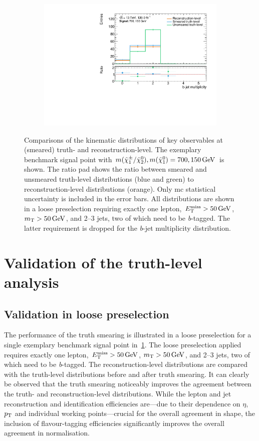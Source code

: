 \begin{figure}
\begin{subfigure}[b]{0.45\linewidth}
		\centering\includegraphics[width=\textwidth]{20210324/700_150/nBJet30_C1N2_Wh_hbb_700p0_150p0_smeared.pdf}
	\end{subfigure}\hfill
	\caption{Comparisons of the kinematic distributions of key observables at (smeared) truth- and reconstruction-level. The exemplary benchmark signal point with $m(\charg/\neutr), m(\lsp) = 700, \SI{150}{\GeV}$ is shown. The ratio pad shows the ratio between smeared and unsmeared truth-level distributions (blue and green) to reconstruction-level distributions (orange). Only \gls{mc} statistical uncertainty is included in the error bars. All distributions are shown in a loose preselection requiring exactly one lepton, $\met>\SI{50}{\GeV}$, $\mt > \SI{50}{\GeV}$, and 2--3 jets, two of which need to be \textit{b}-tagged. The latter requirement is dropped for the \textit{b}-jet multiplicity distribution.}
	\label{fig:smearing_preselection}
\end{figure}
 
\section{Validation of the truth-level analysis}

\subsection{Validation in loose preselection}

 The performance of the truth smearing is illustrated in a loose preselection for a single exemplary benchmark signal point in~\cref{fig:smearing_preselection}. The loose preselection applied requires exactly one lepton, $\met>\SI{50}{\GeV}$, $\mt > \SI{50}{\GeV}$, and 2--3 jets, two of which need to be \textit{b}-tagged. The reconstruction-level distributions are compared with the truth-level distributions before and after truth smearing. It can clearly be observed that the truth smearing noticeably improves the agreement between the truth- and reconstruction-level distributions. While the lepton and jet reconstruction and identification efficiencies are---due to their dependence on $\eta$, $p_{\textrm{T}}$ and individual working points---crucial for the overall agreement in shape, the inclusion of flavour-tagging efficiencies significantly improves the overall agreement in normalisation.
 

